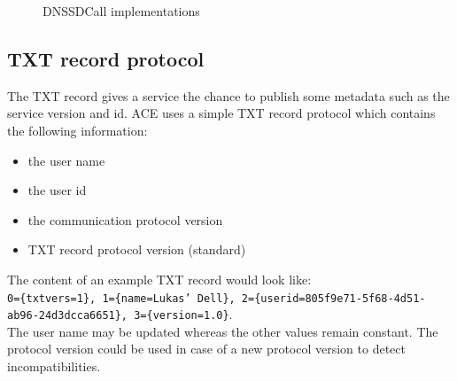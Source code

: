 \begin{figure}[H]
 \centering
 \caption{DNSSDCall implementations}
 \label{fig:network.discovery.manager}
\end{figure}


\subsection{TXT record protocol}
The TXT record gives a service the chance to publish some metadata such as the service version and id. ACE uses a simple TXT record protocol which contains the following information:

\begin{itemize}
\item the user name
\item the user id
\item the communication protocol version
\item TXT record protocol version (standard)
\end{itemize}

The content of an example TXT record would look like: \\
\texttt{0=\{txtvers=1\}, 1=\{name=Lukas' Dell\}, 2=\{userid=805f9e71-5f68-4d51-ab96-24d3dcca6651\}, 3=\{version=1.0\}}.\\The user name may be updated whereas the other values remain constant. The protocol version could be used in case of a new protocol version to detect incompatibilities.

